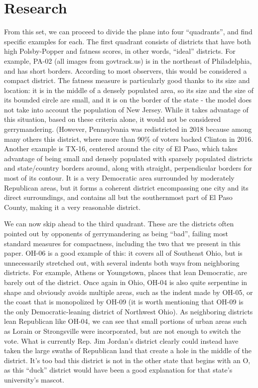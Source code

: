 \documentclass[letterpaper]{article}
\begin{document}
\section{Research}
From this set, we can proceed to divide the plane into four “quadrants”, and find specific examples for each. The first quadrant consists of districts that have both high Polsby-Popper and fatness scores, in other words, “ideal” districts. For example, PA-02 (all images from govtrack.us) is in the northeast of Philadelphia, and has short borders. According to most observers, this would be considered a compact district. The fatness measure is particularly good thanks to its size and location: it is in the middle of a densely populated area, so its size and the size of its bounded circle are small, and it is on the border of the state - the model does not take into account the population of New Jersey. While it takes advantage of this situation, based on these criteria alone, it would not be considered gerrymandering. (However, Pennsylvania was redistricted in 2018 because among many others this district, where more than 90\% of voters backed Clinton in 2016. Another example is TX-16, centered around the city of El Paso, which takes advantage of being small and densely populated with sparsely populated districts and state/country borders around, along with straight, perpendicular borders for most of its contour. It is a very Democratic area surrounded by moderately Republican areas, but it forms a coherent district encompassing one city and its direct surroundings, and contains all but the southernmost part of El Paso County, making it a very reasonable district.


We can now skip ahead to the third quadrant. These are the districts often pointed out by opponents of gerrymandering as being “bad”, failing most standard measures for compactness, including the two that we present in this paper. OH-06 is a good example of this: it covers all of Southeast Ohio, but is unnecessarily stretched out, with several indents both ways from neighboring districts. For example, Athens or Youngstown, places that lean Democratic, are barely out of the district. Once again in Ohio, OH-04 is also quite serpentine in shape and obviously avoids multiple areas, such as the indent made by OH-05, or the coast that is monopolized by OH-09 (it is worth mentioning that OH-09 is the only Democratic-leaning district of Northwest Ohio). As neighboring districts lean Republican like OH-04, we can see that small portions of urban areas such as Lorain or Strongsville were incorporated, but are not enough to switch the vote. What is currently Rep. Jim Jordan’s district clearly could instead have taken the large swaths of Republican land that create a hole in the middle of the district. It’s too bad this district is not in the other state that begins with an O, as this “duck” district would have been a good explanation for that state’s university’s mascot.
\end{document}
